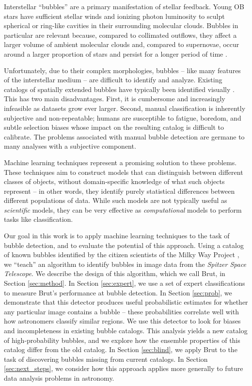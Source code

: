 \documentclass[preprint]{aastex}
\begin{document}
Interstellar ``bubbles'' are a primary manifestation of stellar feedback. Young OB stars have sufficient stellar winds and ionizing photon luminosity to sculpt spherical or ring-like cavities in their surrounding molecular clouds. Bubbles in particular are relevant because, compared to collimated outflows, they affect a larger volume of ambient molecular clouds and, compared to supernovae, occur around a larger proportion of stars and persist for a longer period of time \citep{Matzner02, Arce11}.

Unfortunately, due to their complex morphologies, bubbles -- like many features of the interstellar medium -- are difficult to identify and analyze. Existing catalogs of spatially extended bubbles have typically been identified visually \citep{Hu81, Marston96,  Kiss04, Helfand06, Churchwell06, Churchwell07, Konyves07, Simpson12}. This has two main disadvantages. First, it is cumbersome and increasingly infeasible as datasets grow ever larger. Second, manual classification is inherently subjective and non-repeatable; humans are susceptible to fatigue, boredom, and subtle selection biases whose impact on the resulting catalog is difficult to calibrate. The problems associated with manual bubble detection are germane to many analyses with a subjective component. 

Machine learning techniques represent a promising solution to these problems. These techniques aim to construct models that can distinguish between different classes of objects, without domain-specific knowledge of what such objects represent -- in other words, they identify purely statistical differences between different populations of data. While such models are not typically useful as \textit{scientific} models, they can be very effective as \textit{computational} models to perform tasks like classification. 

Our goal in this work is to apply machine learning techniques to the task of bubble detection, and to evaluate the potential of this approach. Using a catalog of known bubbles identified by the citizen scientists of the Milky Way Project \citep{Simpson12}, we ``teach'' an algorithm to identify bubbles in image data from the \textit{Spitzer Space Telescope}. We describe the design of this algorithm, which we call Brut, in Section \ref{sec:method}. In Section \ref{sec:expert}, we use a set of expert classifications to measure Brut's performance at bubble detection. In Section \ref{sec:prob}, we demonstrate that this detector produces useful probabilistic estimates for whether any particular image contains a bubble -- these probabilities correlate well with how astronomers classify similar regions. We use this detector to look for biases and incompleteness in existing bubble catalogs. This analysis yields a new catalog of high-probability bubbles, and we explore how the ensemble properties of this catalog differ from the old catalog. In Section \ref{sec:blind}, we apply Brut to the task of discovering bubbles missing from current catalogs. In Section \ref{sec:next_steps}, we consider how this approach applies more generally to future data analysis problems in astronomy.
\end{document}
